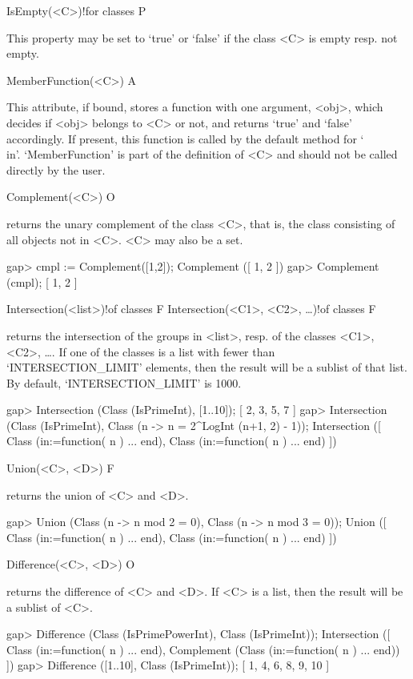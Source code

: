 
\>IsEmpty(<C>)!{for classes} P

This property may be set to `true' or `false' if the class <C> is empty
resp. not empty.

\>MemberFunction(<C>) A

This attribute, if bound, stores a function with one argument, <obj>,
which decides if <obj> belongs to <C> or not, and returns `true' and `false' accordingly.
If present, this function is called by the default method for `\\in'.
`MemberFunction' is part of the definition of <C> and should not be called 
directly by the user.



\null


\>Complement(<C>) O

returns the unary complement of the class <C>, that is, the class consisting
of all objects not in <C>. <C> may also be a set.

\beginexample
gap> cmpl := Complement([1,2]);
Complement ([ 1, 2 ])
gap> Complement (cmpl);
[ 1, 2 ]
\endexample

\>Intersection(<list>)!{of classes} F
\>Intersection(<C1>, <C2>, \dots)!{of classes} F

returns the intersection of the groups in <list>, resp. of the classes
<C1>, <C2>, \dots. If one of the classes is a list with fewer than
`INTERSECTION_LIMIT' elements, then the result will be
a sublist of that list. By default, `INTERSECTION_LIMIT' is 1000. 

\beginexample
gap> Intersection (Class (IsPrimeInt), [1..10]);
[ 2, 3, 5, 7 ]
gap> Intersection (Class (IsPrimeInt), Class (n -> n = 2^LogInt (n+1, 2) - 1));
Intersection ([ Class (in:=function( n ) ... end), 
  Class (in:=function( n ) ... end) ])
\endexample

\>Union(<C>, <D>) F

returns the union of <C> and <D>.  

\beginexample
gap> Union (Class (n -> n mod 2 = 0), Class (n -> n mod 3 = 0));
Union ([ Class (in:=function( n ) ... end), Class (in:=function( n ) ... end) 
 ])
\endexample

\>Difference(<C>, <D>) O

returns the difference of <C> and <D>. If <C> is a list, then the
result will be a sublist of <C>.

\beginexample
gap> Difference (Class (IsPrimePowerInt), Class (IsPrimeInt));
Intersection ([ Class (in:=function( n ) ... end), 
  Complement (Class (in:=function( n ) ... end)) ])
gap> Difference ([1..10], Class (IsPrimeInt));
[ 1, 4, 6, 8, 9, 10 ]
\endexample


